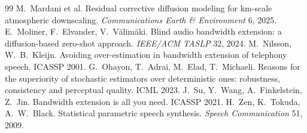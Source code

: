 \documentclass[10pt,letterpaper]{article}
\begin{document}
\begin{thebibliography}{99}
 M.~Mardani et al. Residual corrective diffusion modeling for km-scale atmospheric downscaling. \emph{Communications Earth \& Environment} 6, 2025.
 E.~Moliner, F.~Elvander, V.~V\"alim\"aki. Blind audio bandwidth extension: a diffusion-based zero-shot approach. \emph{IEEE/ACM TASLP} 32, 2024.
 M.~Nilsson, W.~B.~Kleijn. Avoiding over-estimation in bandwidth extension of telephony speech. ICASSP 2001.
 G.~Ohayon, T.~Adrai, M.~Elad, T.~Michaeli. Reasons for the superiority of stochastic estimators over deterministic ones: robustness, consistency and perceptual quality. ICML 2023.
 J.~Su, Y.~Wang, A.~Finkelstein, Z.~Jin. Bandwidth extension is all you need. ICASSP 2021.
 H.~Zen, K.~Tokuda, A.~W.~Black. Statistical parametric speech synthesis. \emph{Speech Communication} 51, 2009.
\end{thebibliography}
\end{document}
